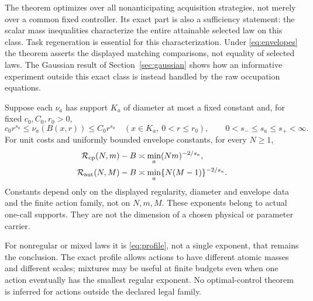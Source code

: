 The theorem optimizes over all nonanticipating acquisition strategies, not merely over a common fixed controller. Its exact part is also a sufficiency statement: the scalar mass inequalities characterize the entire attainable selected law on this class. Task regeneration is essential for this characterization. Under \eqref{eq:envelopes} the theorem asserts the displayed matching comparisons, not equality of selected laws. The Gaussian result of Section~\ref{sec:gaussian} shows how an informative experiment outside this exact class is instead handled by the raw occupation equations.

\begin{corollary}\label{cor:regular}
Suppose each $\nu_a$ has support $K_a$ of diameter at most a fixed constant and, for fixed $c_0,C_0,r_0>0$,
\begin{equation}\label{eq:regular}
 c_0r^{s_a}\le\nu_a(B(x,r))\le C_0r^{s_a}
 \quad(x\in K_a,\ 0<r\le r_0),\qquad
 0<s_-\le s_a\le s_+<\infty.
\end{equation}
For unit costs and uniformly bounded envelope constants, for every $N\ge1$,
\begin{align}
 \mathcal R_{\mathrm{cp}}(N,m)-B&\asymp\min_a(Nm)^{-2/s_a},\label{eq:regular-cp}\\
 \mathcal R_{\mathrm{aut}}(N,M)-B&\asymp\min_a\{N(M-1)\}^{-2/s_a}.
 \label{eq:regular-auto}
\end{align}
Constants depend only on the displayed regularity, diameter and envelope data and the finite action family, not on $N,m,M$. These exponents belong to actual one-call supports. They are not the dimension of a chosen physical or parameter carrier.
\end{corollary}

For nonregular or mixed laws it is \eqref{eq:profile}, not a single exponent, that remains the conclusion. The exact profile allows actions to have different atomic masses and different scales; mixtures may be useful at finite budgets even when one action eventually has the smallest regular exponent. No optimal-control theorem is inferred for actions outside the declared legal family.
